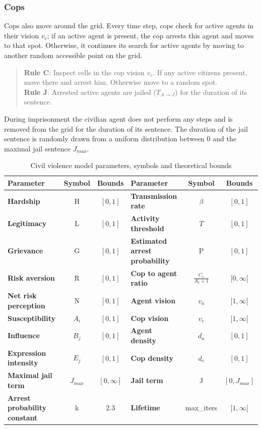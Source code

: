 \documentclass[10pt]{article}
\begin{document}
    \subsubsection{Cops}
    \label{section:cop_entity}

    Cops also move around the grid. Every time step, cops check for active agents in their vision $v_c$; if an active agent is present, the cop arrests this agent and moves to that spot. Otherwise, it continues its search for active agents by moving to another random accessible point on the grid.

    \begin{quote}
        \textbf{Rule C}: Inspect cells in the cop vision $v_c$. If any active citizens present, move there and arrest him. Otherwise move to a random spot.\\
        \textbf{Rule J}: Arrested active agents are jailed ($T_{A \rightarrow J}$) for the duration of its sentence.
    \end{quote}

    During imprisonment the civilian agent does not perform any steps and is removed from the grid for the duration of its sentence. The duration of the jail sentence is randomly drawn from a uniform distribution between $0$ and the maximal jail sentence $J_{max}$.

    \begin{table}[h]
        \centering
        \begin{tabular}{||>{\bfseries}l c c || >{\bfseries}l c c||}
            \hline
            Parameter & Symbol & Bounds & Parameter & Symbol & Bounds \\
            \hline
            \hline
            Hardship & H & $[0,1]$ & Transmission rate & $\beta$ & $[0,1]$ \\
            Legitimacy & L & $[0,1]$ & Activity threshold & $T$ & $[0,1]$ \\
            Grievance & G & $[0,1]$ & Estimated arrest probability & P & $[0,1]$ \\
            Risk aversion & R & $[0,1]$ & Cop to agent ratio & $\frac{C_v}{A_v + 1}$ & $[0,\infty[$ \\
            Net risk perception & N & $[0,1]$ & Agent vision & $v_a$ & $[1, \infty[$ \\
            Susceptibility & $A_i$ & $[0, 1]$ & Cop vision & $v_c$ & $[1, \infty[$ \\
            Influence & $B_j$ & $[0,1]$ & Agent density & $d_a$ & $[0,1]$ \\
            Expression intensity & $E_j$ & $[0,1]$ & Cop density & $d_c$ & $[0,1]$ \\
            Maximal jail term & $J_{max}$ & $[0, \infty]$ & Jail term & J & $[0,J_{max}]$ \\
            Arrest probability constant & k & 2.3 & Lifetime & max\_iters & $[1, \infty[$ \\
            \hline
        \end{tabular}
        \caption{Civil violence model parameters, symbols and theoretical bounds}
        \label{table:parameter_descriptions}
    \end{table}
\end{document}
